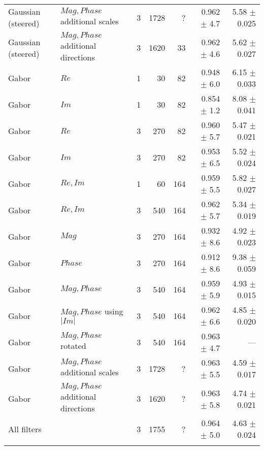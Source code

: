 \begin{tabularx}{\linewidth}{p{3cm} p{3cm} r r r r r}
Gaussian (steered)& $Mag,Phase$ additional scales  
                                    & 3 &   1728    &  ?     & 0.962 $\pm$ 4.7     & 5.58 $\pm$ 0.025 \\
Gaussian (steered)& $Mag,Phase$ additional directions
                                    & 3 &   1620    & 33     & 0.962 $\pm$ 4.6     & 5.62 $\pm$ 0.027 \\

Gabor   & $Re$                      & 1 &     30    & 82     & 0.948 $\pm$ 6.0   & 6.15 $\pm$ 0.033 \\
Gabor   & $Im$                      & 1 &     30    & 82     & 0.854 $\pm$ 1.2   & 8.08 $\pm$ 0.041  \\
Gabor   & $Re$                      & 3 &    270    & 82     & 0.960 $\pm$ 5.7   & 5.47 $\pm$ 0.021 \\
Gabor   & $Im$                      & 3 &    270    & 82     & 0.953 $\pm$ 6.5   & 5.52 $\pm$ 0.024 \\

Gabor   & $Re,Im$                   & 1 &     60    &164     & 0.959 $\pm$ 5.5   & 5.82 $\pm$ 0.027 \\
Gabor   & $Re,Im$                   & 3 &    540    &164     & 0.962 $\pm$ 5.7   & 5.34 $\pm$ 0.019 \\
Gabor   & $Mag$                     & 3 &    270    &164     & 0.932 $\pm$ 8.6     & 4.92 $\pm$  0.023 \\
Gabor   & $Phase$                   & 3 &    270    &164     & 0.912 $\pm$ 8.6     & 9.38 $\pm$  0.059 \\
Gabor   & $Mag,Phase$               & 3 &    540    &164     & 0.959 $\pm$ 5.9     & 4.93 $\pm$  0.015 \\
Gabor   & $Mag,Phase$ using $|Im|$  & 3 &    540    &164     & 0.962 $\pm$ 6.6     & 4.85 $\pm$  0.020 \\
Gabor   & $Mag,Phase$ rotated       & 3 &    540    &164     & 0.963 $\pm$ 4.7     & --- \\
Gabor   & $Mag,Phase$ additional scales  
                                    & 3 &   1728    &?       & 0.963 $\pm$ 5.5     & 4.59 $\pm$ 0.017 \\
Gabor   & $Mag,Phase$ additional directions
                                    & 3 &   1620    &?       & 0.963 $\pm$ 5.8     & 4.74 $\pm$ 0.021 \\


\multicolumn{2}{l}{All filters}     & 3 &   1755    &?       & 0.964 $\pm$ 5.0     & 4.63 $\pm$ 0.024 \\

\bottomrule
\noalign{\smallskip}
\end{tabularx}
